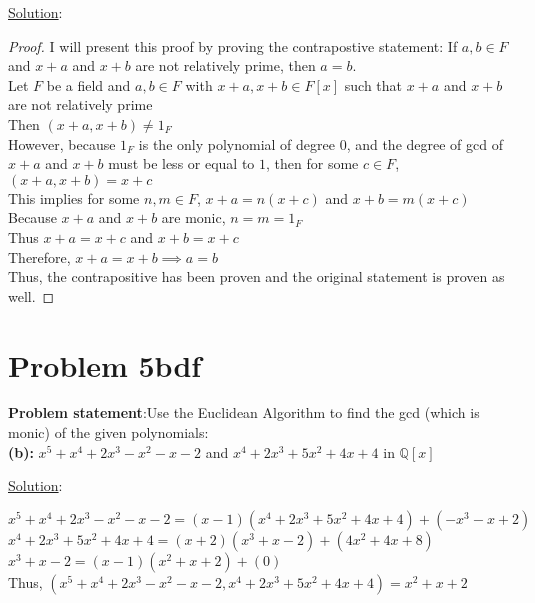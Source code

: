 \documentclass{article} %
\begin{document}
\underline{Solution}: 
\begin{addmargin}[1em]{0em}
\begin{proof}
I will present this proof by proving the contrapostive statement: If $a, b \in F$ and $x + a$ and $x + b$ are not relatively prime, then $a = b$.
\\Let $F$ be a field and $a, b \in F$ with $x + a, x + b \in F[x]$ such that $x +a$ and $x+b$ are not relatively prime
\\Then $(x + a, x + b) \neq 1_F$
\\However, because $1_F$ is the only polynomial of degree $0$, and the degree of gcd of $x + a$ and $x + b$ must be less or equal to $1$, then for some $c \in F$, $(x + a, x + b) = x + c$
\\This implies for some $n,m \in F$, $x + a = n(x + c)$ and $x + b = m(x + c)$
\\Because $x + a$ and $x + b$ are monic, $n = m = 1_F$
\\Thus $x + a = x + c$ and $x + b = x + c$
\\Therefore, $x + a = x + b \implies a = b$
\\Thus, the contrapositive has been proven and the original statement is proven as well.
\end{proof}
\end{addmargin}
\newpage
\section*{Problem 5bdf}
\textbf{Problem statement}:Use the Euclidean Algorithm to find the gcd (which is monic) of the given polynomials:
\\

\textbf{(b): }$x^5 + x^4 + 2x^3 - x^2 -x - 2$ and $x^4 + 2x^3 + 5x^2 + 4x + 4$ in $\mathbb{Q}[x]$
\begin{addmargin}[1em]{0em}
\underline{Solution}: 
\begin{addmargin}[1em]{0em}
$x^5 + x^4 + 2x^3 - x^2 - x - 2 = (x-1)(x^4 + 2x^3 + 5x^2 + 4x + 4) + (-x^3 - x + 2)$
\\$x^4 + 2x^3 + 5x^2 + 4x + 4 = (x + 2)(x^3 + x - 2) + (4x^2 + 4x + 8)$
\\$x^3 + x - 2 = (x - 1)(x^2 + x + 2) + (0)$
\\Thus, $(x^5 + x^4 + 2x^3 - x^2 -x - 2, x^4 + 2x^3 + 5x^2 + 4x + 4) = x^2 + x + 2$
\end{addmargin}
\end{addmargin}
\end{document}
